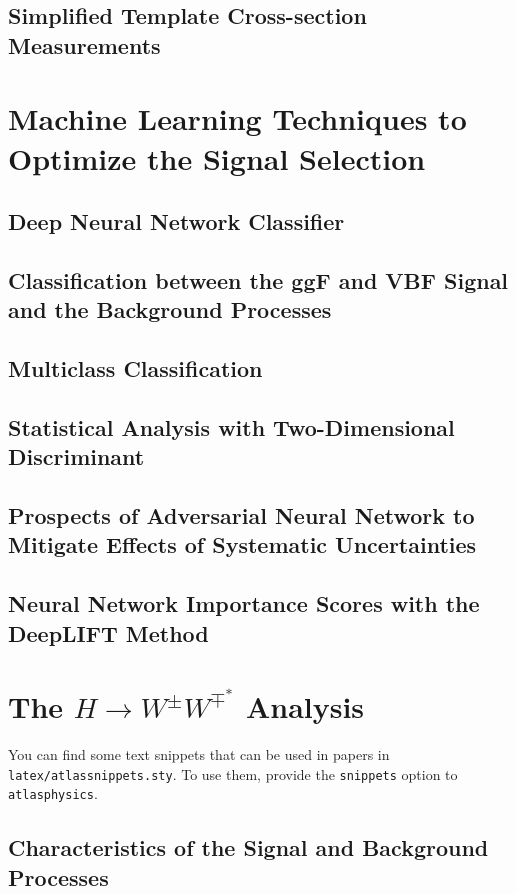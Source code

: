 \section{Simplified Template Cross-section Measurements}

\chapter{Machine Learning Techniques to Optimize the Signal Selection}
\section{Deep Neural Network Classifier}
\section{Classification between the ggF and VBF Signal and the Background Processes}
\section{Multiclass Classification}
\section{Statistical Analysis with Two-Dimensional Discriminant}
\section{Prospects of Adversarial Neural Network to Mitigate Effects of Systematic Uncertainties}
\section{Neural Network Importance Scores with the DeepLIFT Method}

\chapter{The $H\rightarrow W^{\pm}W^{\mp^*}$ Analysis}

You can find some text snippets that can be used in papers in \texttt{latex/atlassnippets.sty}.
To use them, provide the \texttt{snippets} option to \texttt{atlasphysics}.

\section{Characteristics of the Signal and Background Processes}
